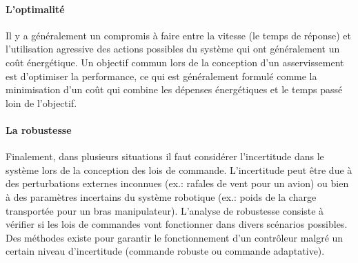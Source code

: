 \paragraph{L'optimalité} 

Il y a généralement un compromis à faire entre la vitesse (le temps de réponse) et l'utilisation agressive des actions possibles du système qui ont généralement un coût énergétique. Un objectif commun lors de la conception d'un asservissement est d'optimiser la performance, ce qui est généralement formulé comme la minimisation d'un coût qui combine les dépenses énergétiques et le temps passé loin de l'objectif.

\paragraph{La robustesse} Finalement, dans plusieurs situations il faut considérer l'incertitude dans le système lors de la conception des lois de commande. L'incertitude peut être due à des perturbations externes inconnues (ex.: rafales de vent pour un avion) ou bien à des paramètres incertains du système robotique (ex.: poids de la charge transportée pour un bras manipulateur). L'analyse de robustesse consiste à vérifier si les lois de commandes vont fonctionner dans divers scénarios possibles. Des méthodes existe pour garantir le fonctionnement d'un contrôleur malgré un certain niveau d'incertitude (commande robuste ou commande adaptative).

